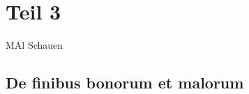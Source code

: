 %
%
%
%
\section{Teil 3
\label{sonogramm:section:teil3}}
MAl Schauen

\subsection{De finibus bonorum et malorum
\label{sonogramm:subsection:malorum}}
